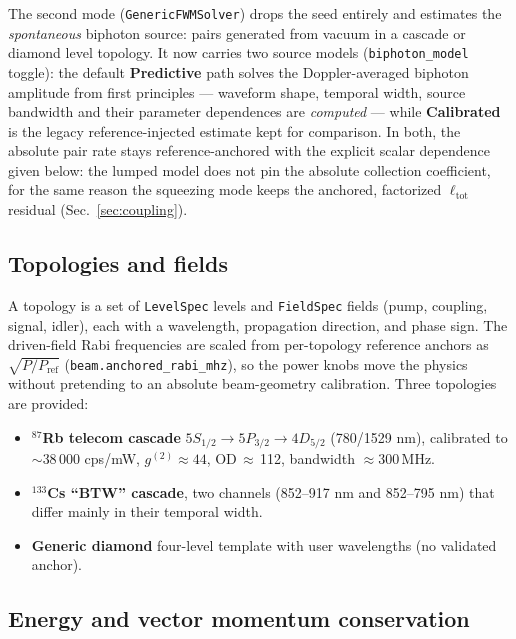 \documentclass[11pt]{article}
\newcommand{\code}[1]{\texttt{#1}}
\begin{document}
The second mode (\code{GenericFWMSolver}) drops the seed entirely and estimates the
\emph{spontaneous} biphoton source: pairs generated from vacuum in a cascade or
diamond level topology. It now carries two source models
(\code{biphoton\_model} toggle): the default \textbf{Predictive} path solves the
Doppler-averaged biphoton amplitude from first principles --- waveform shape,
temporal width, source bandwidth and their parameter dependences are
\emph{computed} --- while \textbf{Calibrated} is the legacy reference-injected
estimate kept for comparison. In both, the absolute pair rate stays
reference-anchored with the explicit scalar dependence given below: the lumped
model does not pin the absolute collection coefficient, for the same reason the
squeezing mode keeps the anchored, factorized $\ell_{\text{tot}}$ residual
(Sec.~\ref{sec:coupling}).

\subsection{Topologies and fields}

A topology is a set of \code{LevelSpec} levels and \code{FieldSpec} fields (pump,
coupling, signal, idler), each with a wavelength, propagation direction, and
phase sign. The driven-field Rabi frequencies are scaled from per-topology
reference anchors as $\sqrt{P/P_{\text{ref}}}$
(\code{beam.anchored\_rabi\_mhz}), so the power knobs move the physics without
pretending to an absolute beam-geometry calibration. Three topologies are
provided:
\begin{itemize}[leftmargin=1.6em]
  \item \textbf{$^{87}$Rb telecom cascade} $5S_{1/2}\!\to\!5P_{3/2}\!\to\!4D_{5/2}$
  (780/1529 nm), calibrated to $\sim$38\,000 cps/mW, $g^{(2)}\!\approx\!44$,
  OD$\,\approx\,$112, bandwidth $\approx300\,$MHz.
  \item \textbf{$^{133}$Cs ``BTW'' cascade}, two channels (852--917 nm and
  852--795 nm) that differ mainly in their temporal width.
  \item \textbf{Generic diamond} four-level template with user wavelengths (no
  validated anchor).
\end{itemize}

\subsection{Energy and vector momentum conservation}
\end{document}
